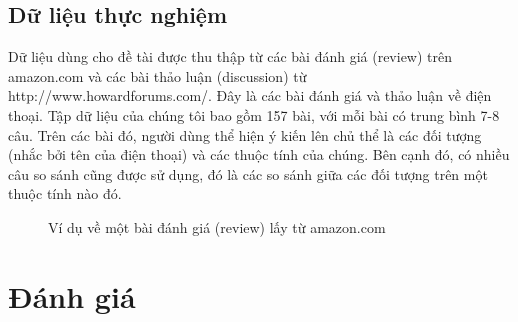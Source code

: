\documentclass[12pt]{report}
\begin{document}
			\subsection*{Dữ liệu thực nghiệm}
				\par Dữ liệu dùng cho đề tài được thu thập từ các bài đánh giá (review) trên amazon.com và các bài thảo luận (discussion) từ http://www.howardforums.com/. Đây là các bài đánh giá và thảo luận về điện thoại. Tập dữ liệu của chúng tôi bao gồm 157 bài, với mỗi bài có trung bình 7-8 câu. Trên các bài đó, người dùng thể hiện ý kiến lên chủ thể là các đối tượng (nhắc bởi tên của điện thoại) và các thuộc tính của chúng. Bên cạnh đó, có nhiều câu so sánh cũng được sử dụng, đó là các so sánh giữa các đối tượng trên một thuộc tính nào đó.
				\begin{figure}[H]
					\centering				
					\noindent{}
					\caption{Ví dụ về một bài đánh giá (review) lấy từ amazon.com}
				\end{figure}

		\section{Đánh giá}			
\end{document}
